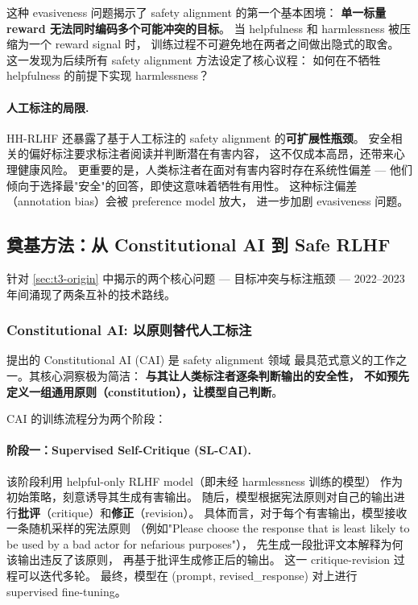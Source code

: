 \noindent
这种 evasiveness 问题揭示了 safety alignment 的第一个基本困境：
\textbf{单一标量 reward 无法同时编码多个可能冲突的目标}。
当 helpfulness 和 harmlessness 被压缩为一个 reward signal 时，
训练过程不可避免地在两者之间做出隐式的取舍。
这一发现为后续所有 safety alignment 方法设定了核心议程：
如何在不牺牲 helpfulness 的前提下实现 harmlessness？

\paragraph{人工标注的局限.}
HH-RLHF 还暴露了基于人工标注的 safety alignment 的\textbf{可扩展性瓶颈}。
安全相关的偏好标注要求标注者阅读并判断潜在有害内容，
这不仅成本高昂，还带来心理健康风险。
更重要的是，人类标注者在面对有害内容时存在系统性偏差 ---
他们倾向于选择最"安全"的回答，即使这意味着牺牲有用性。
这种标注偏差（annotation bias）会被 preference model 放大，
进一步加剧 evasiveness 问题。


\subsection{奠基方法：从 Constitutional AI 到 Safe RLHF}
\label{sec:t3-foundation}

针对 \cref{sec:t3-origin} 中揭示的两个核心问题 --- 目标冲突与标注瓶颈 ---
2022--2023 年间涌现了两条互补的技术路线。

\subsubsection{Constitutional AI: 以原则替代人工标注}
\label{sec:t3-cai}

 提出的 Constitutional AI (CAI) 是 safety alignment 领域
最具范式意义的工作之一。其核心洞察极为简洁：
\textbf{与其让人类标注者逐条判断输出的安全性，
不如预先定义一组通用原则（constitution），让模型自己判断}。

CAI 的训练流程分为两个阶段：

\paragraph{阶段一：Supervised Self-Critique (SL-CAI).}
该阶段利用 helpful-only RLHF model（即未经 harmlessness 训练的模型）
作为初始策略，刻意诱导其生成有害输出。
随后，模型根据宪法原则对自己的输出进行\textbf{批评}（critique）和\textbf{修正}（revision）。
具体而言，对于每个有害输出，模型接收一条随机采样的宪法原则
（例如"Please choose the response that is least likely to be used by a bad actor for nefarious purposes"），
先生成一段批评文本解释为何该输出违反了该原则，
再基于批评生成修正后的输出。
这一 critique-revision 过程可以迭代多轮。
最终，模型在 (prompt, revised\_response) 对上进行 supervised fine-tuning。

